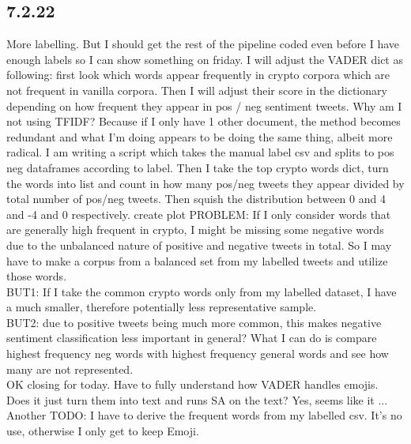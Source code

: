 \subsection{7.2.22}
More labelling. But I should get the rest of the pipeline coded even before I have enough labels so I can show something on friday. I will adjust the VADER dict as following: first look which words appear frequently in crypto corpora which are not frequent in vanilla corpora. Then I will adjust their score in the dictionary depending on how frequent they appear in pos / neg sentiment tweets.
Why am I not using TFIDF? Because if I only have 1 other document, the method becomes redundant and what I'm doing appears to be doing the same thing, albeit more radical.
I am writing a script which takes the manual label csv and splits to pos neg dataframes according to label. Then I take the top crypto words dict, turn the words into list and count in how many pos/neg tweets they appear divided by total number of pos/neg tweets. Then squish the distribution between 0 and 4 and -4 and 0 respectively. create plot
PROBLEM: If I only consider words that are generally high frequent in crypto, I might be missing some negative words due to the unbalanced nature of positive and negative tweets in total. So I may have to make a corpus from a balanced set from my labelled tweets and utilize those words. \\ 
BUT1: If I take the common crypto words only from my labelled dataset, I have a much smaller, therefore potentially less representative sample.\\
BUT2: due to positive tweets being much more common, this makes negative sentiment classification less important in general? What I can do is compare highest frequency neg words with highest frequency general words and see how many are not represented. \\

OK closing for today. Have to fully understand how VADER handles emojis. Does it just turn them into text and runs SA on the text? Yes, seems like it ... \\

Another TODO: I have to derive the frequent words from my labelled csv. It's no use, otherwise I only get to keep Emoji.

